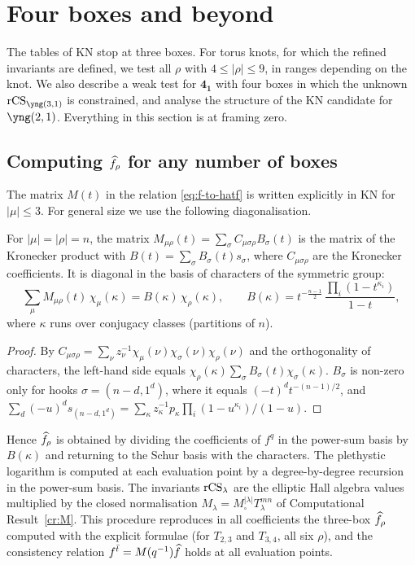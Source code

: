 \section{Four boxes and beyond}\label{sec:higher}

The tables of KN stop at three boxes. For torus knots, for which the refined invariants are defined, we test all $\rho$ with $4\le|\rho|\le9$, in ranges depending on the knot.
We also describe a weak test for $\mathbf{4_1}$ with four boxes in which the unknown $\rCS_{\yng(3,1)}$ is constrained, and analyse the structure of the KN candidate for $\yng(2,1)$.
Everything in this section is at framing zero.

\subsection{Computing \texorpdfstring{$\widehat{f}_\rho$}{f-hat} for any number of boxes}
The matrix $M(t)$ in the relation \eqref{eq:f-to-hatf} is written explicitly in KN for $|\mu|\le3$. For general size we use the following diagonalisation.
\begin{lemma}\label{lem:M-diag}
For $|\mu|=|\rho|=n$, the matrix $M_{\mu\rho}(t)=\sum_\sigma C_{\mu\sigma\rho}B_\sigma(t)$ is the matrix of the Kronecker product with $B(t)=\sum_\sigma B_\sigma(t)s_\sigma$,
where $C_{\mu\sigma\rho}$ are the Kronecker coefficients. It is diagonal in the basis of characters of the symmetric group:
\[
\sum_\mu M_{\mu\rho}(t)\,\chi_\mu(\kappa)=B(\kappa)\,\chi_\rho(\kappa),\qquad
B(\kappa)=t^{-\frac{n-1}2}\,\frac{\prod_i(1-t^{\kappa_i})}{1-t},
\]
where $\kappa$ runs over conjugacy classes (partitions of $n$).
\end{lemma}
\begin{proof}
By $C_{\mu\sigma\rho}=\sum_\nu z_\nu^{-1}\chi_\mu(\nu)\chi_\sigma(\nu)\chi_\rho(\nu)$ and the orthogonality of characters, the left-hand side equals $\chi_\rho(\kappa)\sum_\sigma B_\sigma(t)\chi_\sigma(\kappa)$.
$B_\sigma$ is non-zero only for hooks $\sigma=(n-d,1^d)$, where it equals $(-t)^d t^{-(n-1)/2}$,
and $\sum_{d}(-u)^d s_{(n-d,1^d)}=\sum_\kappa z_\kappa^{-1}p_\kappa\prod_i(1-u^{\kappa_i})/(1-u)$.
\end{proof}
Hence $\widehat{f}_\rho$ is obtained by dividing the coefficients of $f^q$ in the power-sum basis by $B(\kappa)$ and returning to the Schur basis with the characters.
The plethystic logarithm is computed at each evaluation point by a degree-by-degree recursion in the power-sum basis.
The invariants $\mathrm{rCS}_\lambda$ are the elliptic Hall algebra values multiplied by the closed normalisation $M_\lambda=M_\square^{|\lambda|}T_\lambda^{mn}$ of Computational Result~\ref{cr:M}.
This procedure reproduces in all coefficients the three-box $\widehat{f}_\rho$ computed with the explicit formulae (for $T_{2,3}$ and $T_{3,4}$, all six $\rho$),
and the consistency relation $f^{\bar t}=M(q^{-1})\widehat{f}$ holds at all evaluation points.

